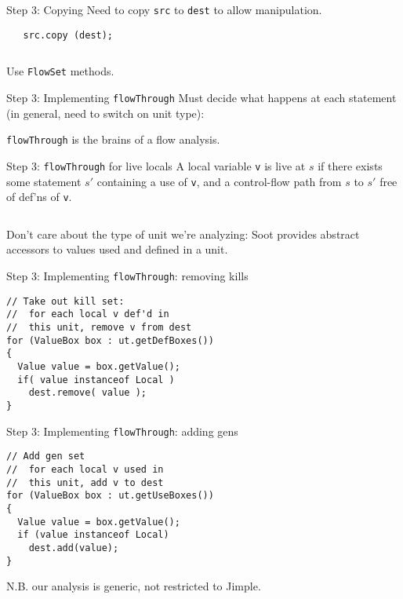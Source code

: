 \begin{slide}{Step 3: Copying}
Need to copy {\tt src} to {\tt dest} to allow manipulation.

\begin{center}

\end{center}

\begin{verbatim}
   src.copy (dest);
\end{verbatim}

$\quad$

Use {\tt FlowSet} methods.
\end{slide}

\begin{slide}{Step 3: Implementing {\tt flowThrough}}
Must decide what happens at each statement (in general, need to switch
on unit type):
\begin{center}
\scalebox{1.3}{
}
\end{center}
{\tt flowThrough} is the brains of a flow analysis.
\end{slide}

\begin{slide}{Step 3: {\tt flowThrough} for live locals}
\vspace*{0.1in}
A local variable {\tt v} is {\red live} at $s$ if there exists some
statement $s'$ containing a use of {\tt v},
and a control-flow path from $s$ to $s'$ free
of def'ns of {\tt v}.

$\quad$

Don't care about the type of unit we're analyzing: Soot provides
abstract accessors to values used and defined in a unit.

\end{slide}

\begin{slide}{Step 3: Implementing {\tt flowThrough}: removing kills}
\begin{verbatim}
// Take out kill set:
//  for each local v def'd in 
//  this unit, remove v from dest
for (ValueBox box : ut.getDefBoxes()) 
{
  Value value = box.getValue();
  if( value instanceof Local )
    dest.remove( value );
}
\end{verbatim}
\end{slide}

\begin{slide}{Step 3: Implementing {\tt flowThrough}: adding gens}
\vspace*{-0.2in}
\begin{verbatim}
// Add gen set
//  for each local v used in 
//  this unit, add v to dest
for (ValueBox box : ut.getUseBoxes()) 
{
  Value value = box.getValue();
  if (value instanceof Local)
    dest.add(value);
}
\end{verbatim}

\vspace*{0.05in}

N.B. our analysis is generic, not restricted to Jimple.
\end{slide}

